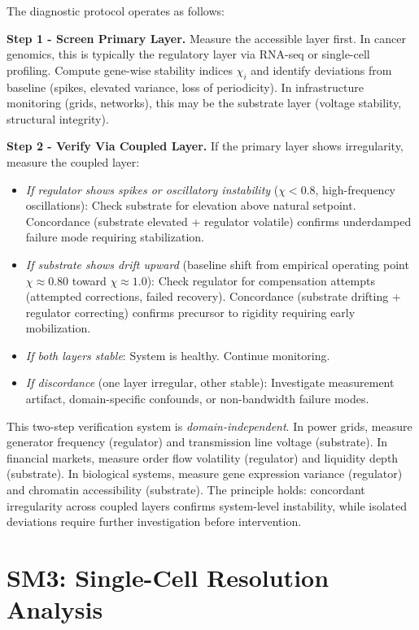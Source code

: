 \documentclass[11pt,letterpaper]{article}
\begin{document}
The diagnostic protocol operates as follows:

\textbf{Step 1 - Screen Primary Layer.} Measure the accessible layer first. In cancer genomics, this is typically the regulatory layer via RNA-seq or single-cell profiling. Compute gene-wise stability indices $\chi_i$ and identify deviations from baseline (spikes, elevated variance, loss of periodicity). In infrastructure monitoring (grids, networks), this may be the substrate layer (voltage stability, structural integrity).

\textbf{Step 2 - Verify Via Coupled Layer.} If the primary layer shows irregularity, measure the coupled layer:
\begin{itemize}
\item \textit{If regulator shows spikes or oscillatory instability} ($\chi < 0.8$, high-frequency oscillations): Check substrate for elevation above natural setpoint. Concordance (substrate elevated + regulator volatile) confirms underdamped failure mode requiring stabilization.
\item \textit{If substrate shows drift upward} (baseline shift from empirical operating point $\chi \approx 0.80$ toward $\chi \approx 1.0$): Check regulator for compensation attempts (attempted corrections, failed recovery). Concordance (substrate drifting + regulator correcting) confirms precursor to rigidity requiring early mobilization.
\item \textit{If both layers stable}: System is healthy. Continue monitoring.
\item \textit{If discordance} (one layer irregular, other stable): Investigate measurement artifact, domain-specific confounds, or non-bandwidth failure modes.
\end{itemize}

This two-step verification system is \textit{domain-independent}. In power grids, measure generator frequency (regulator) and transmission line voltage (substrate). In financial markets, measure order flow volatility (regulator) and liquidity depth (substrate). In biological systems, measure gene expression variance (regulator) and chromatin accessibility (substrate). The principle holds: concordant irregularity across coupled layers confirms system-level instability, while isolated deviations require further investigation before intervention.

\section{SM3: Single-Cell Resolution Analysis}
\end{document}
